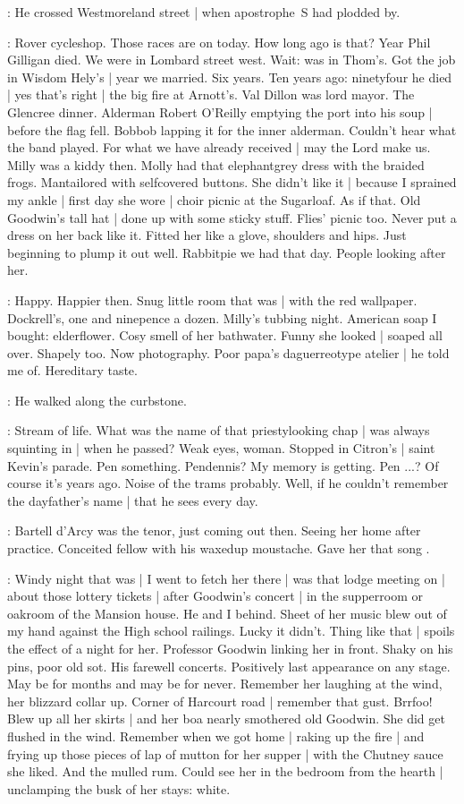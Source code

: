 :
He crossed Westmoreland street |
when apostrophe~S had plodded by.

\BloomInt:
Rover cycleshop.
Those races are on today.
How long ago is that?
Year Phil Gilligan died.
We were in Lombard street west.
Wait:
was in Thom's.
Got the job in Wisdom Hely's |
year we married.
Six years.
Ten years ago:
ninetyfour he died |
yes that's right |
the big fire at Arnott's.
Val Dillon was lord mayor.
The Glencree dinner.
Alderman Robert O'Reilly emptying the port into his soup |
before the flag fell.
Bobbob lapping it for the inner alderman.
Couldn't hear what the band played.
For what we have already received |
may the Lord make us.
Milly was a kiddy then.
Molly had that elephantgrey dress with the braided frogs.
Mantailored with selfcovered buttons.
She didn't like it |
because I sprained my ankle |
first day she wore |
choir picnic at the Sugarloaf.
As if that.
Old Goodwin's tall hat |
done up with some sticky stuff.
Flies' picnic too.
Never put a dress on her back like it.
Fitted her like a glove,
shoulders and hips.
Just beginning to plump it out well.
Rabbitpie we had that day.
People looking after her.


\BloomInt:
Happy.
Happier then.
Snug little room that was |
with the red wallpaper.
Dockrell's, one and ninepence a dozen.
Milly's tubbing night.
American soap I bought:
elderflower.
Cosy smell of her bathwater.
Funny she looked |
soaped all over.
Shapely too.
Now photography.
Poor papa's daguerreotype atelier |
he told me of.
Hereditary taste.

:
He walked along the curbstone.

\BloomInt:
Stream of life.
What was the name of that priestylooking chap |
was always squinting in |
when he passed?
Weak eyes,
woman.
Stopped in Citron's |
saint Kevin's parade.
Pen something.
Pendennis?
My memory is getting.
Pen ...?
Of course it's years ago.
Noise of the trams probably.
Well, if he couldn't remember the dayfather's name |
that he sees every day.

\BloomInt:
Bartell d'Arcy was the tenor,
just coming out then.
Seeing her home after practice.
Conceited fellow with his waxedup moustache.
Gave her that song
.

\BloomInt:
Windy night that was |
I went to fetch her there |
was that lodge meeting on |
about those lottery tickets |
after Goodwin's concert |
in the supperroom or oakroom of the Mansion house.
He and I behind.
Sheet of her music blew out of my hand
against the High school railings.
Lucky it didn't.
Thing like that |
spoils the effect of a night for her.
Professor Goodwin linking her in front.
Shaky on his pins,
poor old sot.
His farewell concerts.
Positively last appearance on any stage.
May be for months and may be for never.
Remember her laughing at the wind,
her blizzard collar up.
Corner of Harcourt road |
remember that gust.
Brrfoo!
Blew up all her skirts |
and her boa nearly smothered old Goodwin.
She did get flushed in the wind.
Remember when we got home |
raking up the fire |
and frying up those pieces of lap of mutton for her supper |
with the Chutney sauce she liked.
And the mulled rum.
Could see her in the bedroom from the hearth |
unclamping the busk of her stays:
white.

